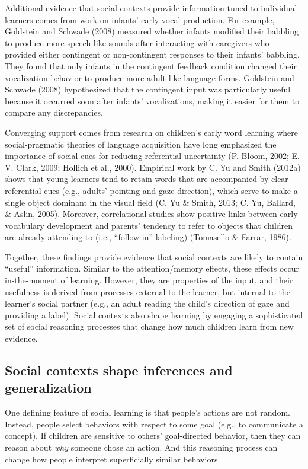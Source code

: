 \documentclass[english,floatsintext,man]{apa6}
\theoremstyle{definition}
\theoremstyle{definition}
\theoremstyle{definition}
\theoremstyle{remark}
\begin{document}
Additional evidence that social contexts provide information tuned to
individual learners comes from work on infants' early vocal production.
For example, Goldstein and Schwade (2008) measured whether infants
modified their babbling to produce more speech-like sounds after
interacting with caregivers who provided either contingent or
non-contingent responses to their infants' babbling. They found that
only infants in the contingent feedback condition changed their
vocalization behavior to produce more adult-like language forms.
Goldstein and Schwade (2008) hypothesized that the contingent input was
particularly useful because it occurred soon after infants'
vocalizations, making it easier for them to compare any discrepancies.

Converging support comes from research on children's early word learning
where social-pragmatic theories of language acquisition have long
emphasized the importance of social cues for reducing referential
uncertainty (P. Bloom, 2002; E. V. Clark, 2009; Hollich et al., 2000).
Empirical work by C. Yu and Smith (2012a) shows that young learners tend
to retain words that are accompanied by clear referential cues (e.g.,
adults' pointing and gaze direction), which serve to make a single
object dominant in the visual field (C. Yu \& Smith, 2013; C. Yu,
Ballard, \& Aslin, 2005). Moreover, correlational studies show positive
links between early vocabulary development and parents' tendency to
refer to objects that children are already attending to (i.e.,
\enquote{follow-in} labeling) (Tomasello \& Farrar, 1986).

Together, these findings provide evidence that social contexts are
likely to contain \enquote{useful} information. Similar to the
attention/memory effects, these effects occur in-the-moment of learning.
However, they are properties of the input, and their usefulness is
derived from processes external to the learner, but internal to the
learner's social partner (e.g., an adult reading the child's direction
of gaze and providing a label). Social contexts also shape learning by
engaging a sophisticated set of social reasoning processes that change
how much children learn from new evidence.

\subsection{Social contexts shape inferences and
generalization}\label{social-contexts-shape-inferences-and-generalization}

One defining feature of social learning is that people's actions are not
random. Instead, people select behaviors with respect to some goal
(e.g., to communicate a concept). If children are sensitive to others'
goal-directed behavior, then they can reason about \emph{why} someone
chose an action. And this reasoning process can change how people
interpret superficially similar behaviors.
\end{document}
